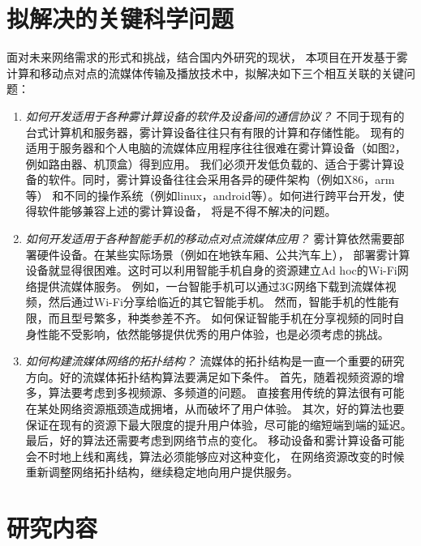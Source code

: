

\section{拟解决的关键科学问题}

面对未来网络需求的形式和挑战，结合国内外研究的现状，
本项目在开发基于雾计算和移动点对点的流媒体传输及播放技术中，拟解决如下三个相互关联的关键问题：

\begin{enumerate}
\item \emph{如何开发适用于各种雾计算设备的软件及设备间的通信协议？}
不同于现有的台式计算机和服务器，雾计算设备往往只有有限的计算和存储性能。
现有的适用于服务器和个人电脑的流媒体应用程序往往很难在雾计算设备（如图2，例如路由器、机顶盒）得到应用。
我们必须开发低负载的、适合于雾计算设备的软件。同时，雾计算设备往往会采用各异的硬件架构（例如X86，arm等）
和不同的操作系统（例如linux，android等）。如何进行跨平台开发，使得软件能够兼容上述的雾计算设备，
将是不得不解决的问题。

\item \emph{如何开发适用于各种智能手机的移动点对点流媒体应用？}
雾计算依然需要部署硬件设备。在某些实际场景（例如在地铁车厢、公共汽车上），
部署雾计算设备就显得很困难。这时可以利用智能手机自身的资源建立Ad hoc的Wi-Fi网络提供流媒体服务。
例如，一台智能手机可以通过3G网络下载到流媒体视频，然后通过Wi-Fi分享给临近的其它智能手机。
然而，智能手机的性能有限，而且型号繁多，种类参差不齐。
如何保证智能手机在分享视频的同时自身性能不受影响，依然能够提供优秀的用户体验，也是必须考虑的挑战。

\item \emph{如何构建流媒体网络的拓扑结构？}
流媒体的拓扑结构是一直一个重要的研究方向。好的流媒体拓扑结构算法要满足如下条件。
首先，随着视频资源的增多，算法要考虑到多视频源、多频道的问题。
直接套用传统的算法很有可能在某处网络资源瓶颈造成拥堵，从而破坏了用户体验。
其次，好的算法也要保证在现有的资源下最大限度的提升用户体验，尽可能的缩短端到端的延迟。
最后，好的算法还需要考虑到网络节点的变化。
移动设备和雾计算设备可能会不时地上线和离线，算法必须能够应对这种变化，
在网络资源改变的时候重新调整网络拓扑结构，继续稳定地向用户提供服务。
\end{enumerate}

\section{研究内容}

